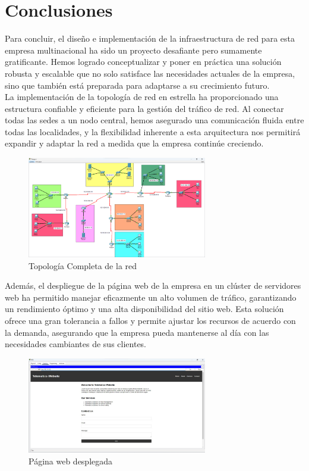 \section{Conclusiones}

Para concluir, el diseño e implementación de la infraestructura de red para esta
empresa multinacional ha sido un proyecto desafiante pero sumamente
gratificante. Hemos logrado conceptualizar y poner en práctica una solución
robusta y escalable que no solo satisface las necesidades actuales de la
empresa, sino que también está preparada para adaptarse a su crecimiento futuro.
\\

La implementación de la topología de red en estrella ha proporcionado una
estructura confiable y eficiente para la gestión del tráfico de red. Al conectar
todas las sedes a un nodo central, hemos asegurado una comunicación fluida entre
todas las localidades, y la flexibilidad inherente a esta arquitectura nos
permitirá expandir y adaptar la red a medida que la empresa continúe creciendo.

\begin{figure}[H]
    \centering
    \includegraphics[width=0.7\textwidth]{Figures/4. Conclusions/final_result.png}
    \caption{Topología Completa de la red}
    \label{fig: Topologia Completa de la red}
\end{figure}

Además, el despliegue de la página web de la empresa en un clúster de servidores
web ha permitido manejar eficazmente un alto volumen de tráfico, garantizando un
rendimiento óptimo y una alta disponibilidad del sitio web. Esta solución ofrece
una gran tolerancia a fallos y permite ajustar los recursos de acuerdo con la
demanda, asegurando que la empresa pueda mantenerse al día con las necesidades
cambiantes de sus clientes.

\begin{figure}[H]
    \centering
    \includegraphics[width=0.7\textwidth]{Figures/4. Conclusions/web_page.png}
    \caption{Página web desplegada}
    \label{fig: deployed web page}
\end{figure}


